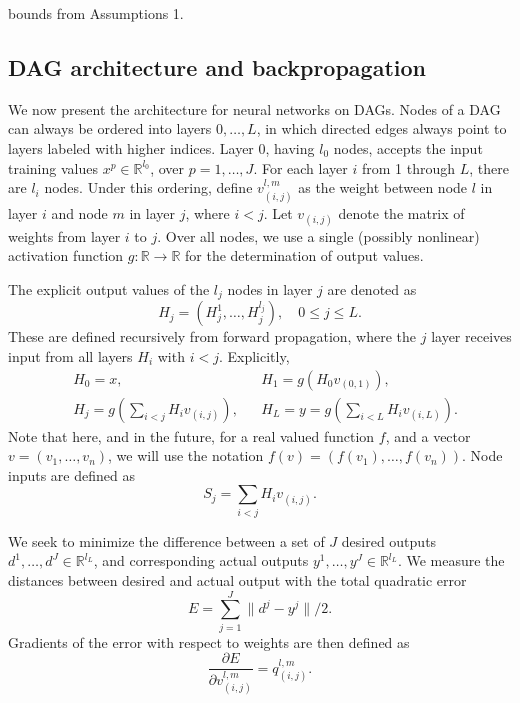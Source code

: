 \documentclass{jcmlatex}
\begin{document}
bounds from Assumptions 1.\subsection{DAG architecture and backpropagation}
We now present the architecture for neural networks on DAGs. Nodes of a  DAG can always be ordered into layers $0, \dots, L$, in which directed edges always point to layers labeled with higher indices.  Layer 0, having $l_0$ nodes,  accepts the input training values $x^p \in \mathbb R^{l_0}$, over $ p = 1, \dots, J$.  For each layer $i$  from 1 through $L$, there are $l_i$ nodes. Under this ordering, define $v_{(i,j)}^{l,m}$ as the weight between node $l$ in layer $i$ and node $m$ in layer $j$, where $i<j$. Let $v_{(i,j)}$ denote the matrix of weights from layer $i$ to $j$. Over all nodes, we use a single (possibly nonlinear) activation function $g:\mathbb R\rightarrow \mathbb R$  for the determination of output values.

The explicit output values of the $l_j$ nodes in layer $j$ are denoted as
\begin{equation}
H_j = (H_j^1, \dots, H_j^{l_j}), \quad 0 \le j \le L.
\end{equation}
These are defined recursively from forward propagation, where the $j$ layer receives input from all layers $H_i$ with $i<j$. Explicitly,
\begin{align}
&H_0 = x,  &&H_1 = g\left(H_0 v_{(0,1)} \right),\\
&H_j = g\left(\sum_{i < j} H_iv_{(i,j)} \right),  &&H_L = y = g\left(\sum_{i <L } H_iv_{(i,L)} \right).\label{nodeeqn}
\end{align}
 Note that here, and in the future, for
a real valued function $f$, and a vector $v= (v_1, \dots, v_n)$, we will use
the notation $f(v) = (f(v_1), \dots, f(v_n))$. Node inputs are defined as
 \begin{equation}
 S_j= \sum_{i < j} H_iv_{(i,j)}.
 \end{equation}

We seek to minimize the difference between a set of  $J$ desired outputs $d^1, \dots, d^J \in \mathbb{R}^{l_L}$, and corresponding actual outputs  $y^1, \dots, y^J \in \mathbb{R}^{l_L}$. We measure the distances between desired and actual output with the total quadratic error
\begin{equation}
E = \sum_{j = 1}^J \|d^j-y^j\|/2. \label{generrordef}
\end{equation}
Gradients of the error with respect to weights are then defined as
\begin{equation}\label{defq}
\frac{\partial E}{\partial v_{(i,j)}^{l,m}} =  q_{(i,j)}^{l,m}.
\end{equation}
\end{document}
